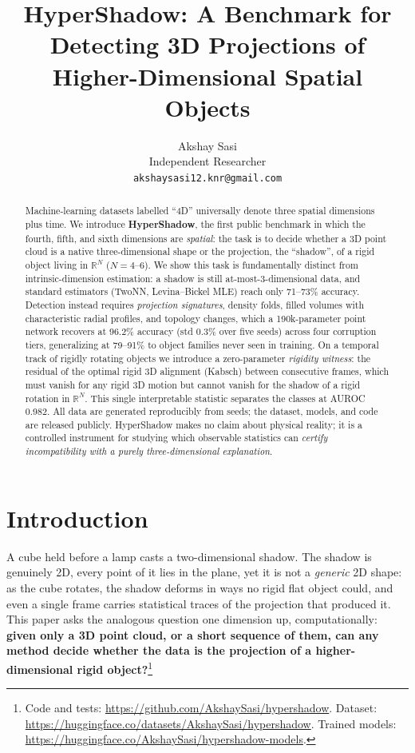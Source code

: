 \documentclass{article}
\title{HyperShadow: A Benchmark for Detecting 3D Projections of Higher-Dimensional Spatial Objects}
\author{%
  Akshay Sasi \\
  Independent Researcher \\
  \texttt{akshaysasi12.knr@gmail.com} \\
}
\begin{document}
\maketitle

\begin{abstract}
Machine-learning datasets labelled ``4D'' universally denote three spatial dimensions plus time. We introduce \textbf{HyperShadow}, the first public benchmark in which the fourth, fifth, and sixth dimensions are \emph{spatial}: the task is to decide whether a 3D point cloud is a native three-dimensional shape or the projection, the ``shadow'', of a rigid object living in $\mathbb{R}^N$ ($N{=}4$--$6$). We show this task is fundamentally distinct from intrinsic-dimension estimation: a shadow is still at-most-3-dimensional data, and standard estimators (TwoNN, Levina--Bickel MLE) reach only 71--73\% accuracy. Detection instead requires \emph{projection signatures}, density folds, filled volumes with characteristic radial profiles, and topology changes, which a 190k-parameter point network recovers at 96.2\% accuracy (std 0.3\% over five seeds) across four corruption tiers, generalizing at 79--91\% to object families never seen in training. On a temporal track of rigidly rotating objects we introduce a zero-parameter \emph{rigidity witness}: the residual of the optimal rigid 3D alignment (Kabsch) between consecutive frames, which must vanish for any rigid 3D motion but cannot vanish for the shadow of a rigid rotation in $\mathbb{R}^N$. This single interpretable statistic separates the classes at AUROC 0.982. All data are generated reproducibly from seeds; the dataset, models, and code are released publicly. HyperShadow makes no claim about physical reality; it is a controlled instrument for studying which observable statistics can \emph{certify incompatibility with a purely three-dimensional explanation}.
\end{abstract}

\section{Introduction}

A cube held before a lamp casts a two-dimensional shadow. The shadow is genuinely 2D, every point of it lies in the plane, yet it is not a \emph{generic} 2D shape: as the cube rotates, the shadow deforms in ways no rigid flat object could, and even a single frame carries statistical traces of the projection that produced it. This paper asks the analogous question one dimension up, computationally: \textbf{given only a 3D point cloud, or a short sequence of them, can any method decide whether the data is the projection of a higher-dimensional rigid object?}\footnote{Code and tests: \url{https://github.com/AkshaySasi/hypershadow}. Dataset: \url{https://huggingface.co/datasets/AkshaySasi/hypershadow}. Trained models: \url{https://huggingface.co/AkshaySasi/hypershadow-models}.}
\end{document}
